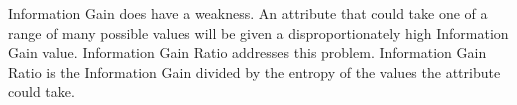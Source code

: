 \documentclass[12pt, letterpaper]{article}
\begin{document}
Information Gain does have a weakness.  An attribute that could take one of a range of many
possible values will be given a disproportionately high Information Gain value.  Information
Gain Ratio addresses this problem.  Information Gain Ratio is the Information Gain divided by the 
entropy of the values the attribute could take.  





\end{document}

